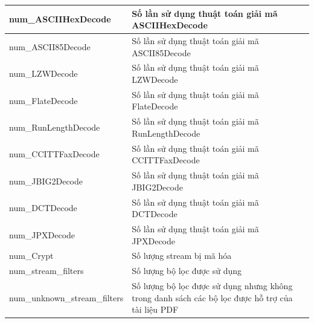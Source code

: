\documentclass[./../main.tex]{subfiles}
\begin{document}
\begin{longtable}[c]{|p{}|p{}|}
	num\_ASCIIHexDecode                       & Số lần sử dụng thuật toán giải mã ASCIIHexDecode                                                                            \\ \hline
	num\_ASCII85Decode                        & Số lần sử dụng thuật toán giải mã ASCII85Decode                                                                             \\ \hline
	num\_LZWDecode                            & Số lần sử dụng thuật toán giải mã LZWDecode                                                                                 \\ \hline
	num\_FlateDecode                          & Số lần sử dụng thuật toán giải mã FlateDecode                                                                               \\ \hline
	num\_RunLengthDecode                      & Số lần sử dụng thuật toán giải mã RunLengthDecode                                                                           \\ \hline
	num\_CCITTFaxDecode                       & Số lần sử dụng thuật toán giải mã CCITTFaxDecode                                                                            \\ \hline
	num\_JBIG2Decode                          & Số lần sử dụng thuật toán giải mã JBIG2Decode                                                                               \\ \hline
	num\_DCTDecode                            & Số lần sử dụng thuật toán giải mã DCTDecode                                                                                 \\ \hline
	num\_JPXDecode                            & Số lần sử dụng thuật toán giải mã JPXDecode                                                                                 \\ \hline
	num\_Crypt                                & Số lượng stream bị mã hóa                                                                                                   \\ \hline
	num\_stream\_filters                      & Số lượng bộ lọc được sử dụng                                                                                                \\ \hline
	num\_unknown\_stream\_filters             & Số lượng bộ lọc được sử dụng nhưng không trong danh sách các bộ lọc được hỗ trợ của tài liệu PDF                            \\ \hline
\end{longtable}
\end{document}
